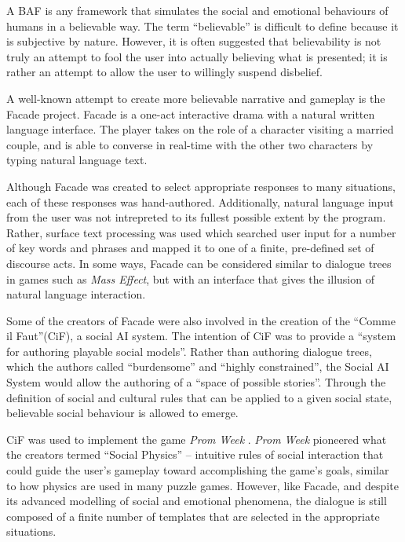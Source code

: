 \documentclass{article}
\begin{document}
A BAF is any framework that simulates the social and emotional
behaviours of humans in a believable way.  The term ``believable'' is
difficult to define because it is subjective by nature.  However, it
is often suggested that believability is not truly an attempt to fool
the user into actually believing what is presented; it is rather an
attempt to allow the user to willingly suspend disbelief. \cite{Acton2009}

A well-known attempt to create more believable narrative and gameplay
is the Facade
project\cite{Mateas}.  Facade is a one-act interactive drama with a
natural written language interface.  The player takes on the role of a
character visiting a married couple, and is able to converse in
real-time with the other two characters by typing natural language
text.

Although Facade was created to select appropriate responses to many
situations, each of these responses was hand-authored.  Additionally,
natural language input from the user was not intrepreted to its
fullest possible extent by the program.  Rather, surface text
processing was used which searched user input for a number of key
words and phrases and mapped it to one of a finite, pre-defined set of
discourse acts. \cite{Mateasa}  In some ways, Facade can be considered
similar to dialogue trees in games such as \emph{Mass Effect}, but with an
interface that gives the illusion of natural language interaction.

Some of the creators of Facade were also involved in the
creation of the ``Comme il Faut''(CiF)\cite{Mccoy2010}, a social AI
system.  The intention of CiF was to provide a ``system for authoring playable social
models''\cite{Mccoy2010}.  Rather than authoring dialogue trees, which
the authors called ``burdensome''  and ``highly constrained'', the
Social AI System  would allow the authoring of a ``space of possible
stories''.  Through the definition of social and cultural rules that
can be applied to a given social state, believable social behaviour is
allowed to emerge.

CiF was used to implement the game \emph{Prom Week} \cite{Mateas2011}.
\emph{Prom Week} pioneered what the creators termed ``Social
Physics''\cite{Mccoy2011} -- intuitive rules of social
interaction that could guide the user's gameplay toward accomplishing
the game's goals, similar to how physics are used in many puzzle
games.  However, like Facade, and despite its advanced modelling of
social and emotional phenomena, the dialogue is still composed of a
finite number of templates that are selected in the appropriate
situations.
\end{document}
